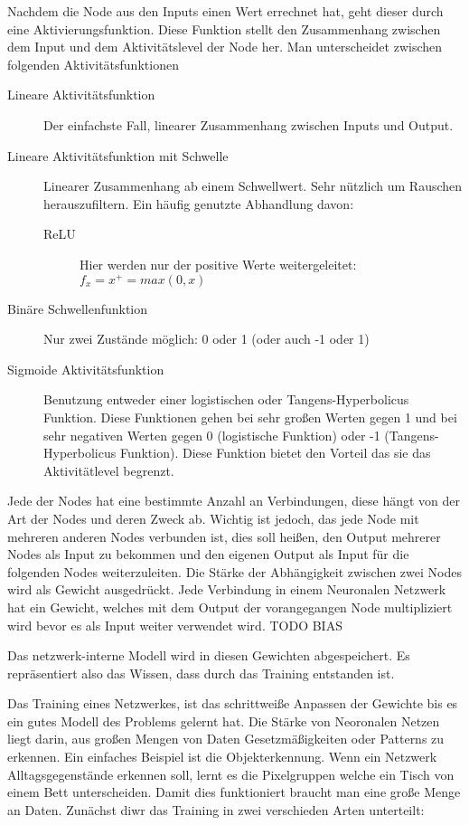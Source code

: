 \documentclass[pdftex,a4paper,halfparskip]{scrartcl}
\begin{document}
Nachdem die Node aus den Inputs einen Wert errechnet hat, geht dieser durch eine Aktivierungsfunktion. Diese Funktion stellt den Zusammenhang zwischen dem Input und dem Aktivitätslevel der Node her. Man unterscheidet zwischen folgenden Aktivitätsfunktionen

\begin{description}
	\item[Lineare Aktivitätsfunktion] Der einfachste Fall, linearer Zusammenhang zwischen Inputs und Output.
	\item[Lineare Aktivitätsfunktion mit Schwelle] Linearer Zusammenhang ab einem Schwellwert. Sehr nützlich um Rauschen herauszufiltern. Ein häufig genutzte Abhandlung davon:
	\begin{description}
		\item[ReLU] Hier werden nur der positive Werte weitergeleitet: \(f_x = x^+ = max(0,x) \)
	\end{description}
	\item[Binäre Schwellenfunktion] Nur zwei Zustände möglich: 0 oder 1 (oder auch -1 oder 1)
	\item[Sigmoide Aktivitätsfunktion] Benutzung entweder einer logistischen oder Tangens-Hyperbolicus Funktion. Diese Funktionen gehen bei sehr großen Werten gegen 1 und bei sehr negativen Werten gegen 0 (logistische Funktion) oder -1 (Tangens-Hyperbolicus Funktion). Diese Funktion bietet den Vorteil das sie das Aktivitätlevel begrenzt.
\end{description} 

Jede der Nodes hat eine bestimmte Anzahl an Verbindungen, diese hängt von der Art der Nodes und deren Zweck ab. Wichtig ist jedoch, das jede Node mit mehreren anderen Nodes verbunden ist, dies soll heißen, den Output mehrerer Nodes als Input zu bekommen und den eigenen Output als Input für die folgenden Nodes weiterzuleiten. Die Stärke der Abhängigkeit zwischen zwei Nodes wird als Gewicht ausgedrückt. Jede Verbindung in einem Neuronalen Netzwerk hat ein Gewicht, welches mit dem Output der vorangegangen Node multipliziert wird bevor es als Input weiter verwendet wird. TODO BIAS

Das netzwerk-interne Modell wird in diesen Gewichten abgespeichert. Es repräsentiert also das Wissen, dass durch das Training entstanden ist.

Das Training eines Netzwerkes, ist das schrittweiße Anpassen der Gewichte bis es ein gutes Modell des Problems gelernt hat. Die Stärke von Neoronalen Netzen liegt darin, aus großen Mengen von Daten Gesetzmäßigkeiten oder Patterns zu erkennen. Ein einfaches Beispiel ist die Objekterkennung. Wenn ein Netzwerk Alltagsgegenstände erkennen soll, lernt es die Pixelgruppen welche ein Tisch von einem Bett unterscheiden. Damit dies funktioniert braucht man eine große Menge an Daten. Zunächst diwr das Training in zwei verschieden Arten unterteilt: 
\end{document}
